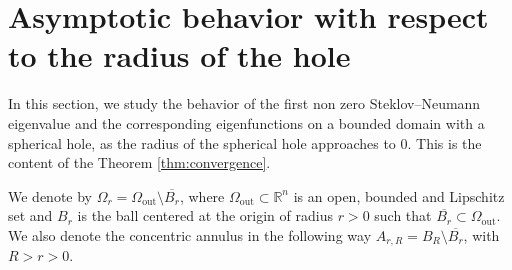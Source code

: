 \documentclass[12pt,reqno]{amsart}
\numberwithin{equation}{section}
\numberwithin{theorem}{section}
\numberwithin{equation}{section}
\numberwithin{theorem}{section}
\begin{document}
\section{Asymptotic behavior with respect to the radius of the hole}
In this section, we study the behavior of the first non zero Steklov--Neumann eigenvalue and the corresponding eigenfunctions on a bounded domain with a spherical hole, as the radius of the spherical hole approaches to 0. This is the content of the Theorem \ref{thm:convergence}. %




 We denote by $\Omega_r=\Omega_{\mathrm{out}} \setminus\overline{B_r}$, where $\Omega_{\mathrm{out}} \subset\mathbb{R}^n$ is an open, bounded and Lipschitz set and $B_r$ is the ball centered at the origin of radius $r>0$ such that $\overline{B_r}\subset \Omega_{\mathrm{out}}$.
We also denote the concentric annulus in the following way $A_{r,R}=B_R\setminus\overline{B_r}$, with $R>r>0$.
 
\end{document}
